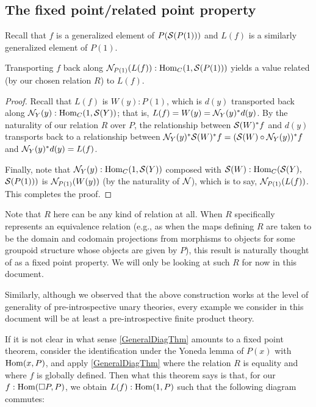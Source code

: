 \subsection{The fixed point/related point property}
Recall that $f$ is a generalized element of $P(\mathcal{S}(P(1)))$ and $L(f)$ is a similarly generalized element of $P(1)$.
\begin{theorem}\label{GeneralDiagThm}
Transporting $f$ back along $\mathcal{N}_{P(1)}(L(f)) : \operatorname{Hom}_C(1, \mathcal{S}(P(1)))$ yields a value related (by our chosen relation $R$) to $L(f)$.
\end{theorem}
\begin{proof}
Recall that $L(f)$ is $W(y) : P(1)$, which is $d(y)$ transported back along $\mathcal{N}_Y(y) : \operatorname{Hom}_C(1, \mathcal{S}(Y))$; that is, $L(f) = W(y) = \mathcal{N}_Y(y)^* d(y)$. By the naturality of our relation $R$ over $P$, the relationship between $\mathcal{S}(W)^*f$ and $d(y)$ transports back to a relationship between $\mathcal{N}_Y(y)^* \mathcal{S}(W)^*f = (\mathcal{S}(W) \circ \mathcal{N}_Y(y))^* f$ and $\mathcal{N}_Y(y)^* d(y) = L(f)$.

Finally, note that $\mathcal{N}_Y(y) : \operatorname{Hom}_C(1, \mathcal{S}(Y))$ composed with $\mathcal{S}(W) : \operatorname{Hom}_C(\mathcal{S}(Y),$ $ \mathcal{S}(P(1)))$ is $\mathcal{N}_{P(1)}(W(y))$ (by the naturality of $\mathcal{N}$), which is to say, $\mathcal{N}_{P(1)}(L(f))$. This completes the proof.
\end{proof}

Note that $R$ here can be any kind of relation at all. When $R$ specifically represents an equivalence relation (e.g., as when the maps defining $R$ are taken to be the domain and codomain projections from morphisms to objects for some groupoid structure whose objects are given by $P$), this result is naturally thought of as a fixed point property. We will only be looking at such $R$ for now in this document.

Similarly, although we observed that the above construction works at the level of generality of pre-introspective unary theories, every example we consider in this document will be at least a pre-introspective finite product theory.

If it is not clear in what sense \cref{GeneralDiagThm} amounts to a fixed point theorem, consider the identification under the Yoneda lemma of $P(x)$ with $\operatorname{Hom}(x, P)$, and apply \cref{GeneralDiagThm} where the relation $R$ is equality and where $f$ is globally defined. Then what this theorem says is that, for our $f : \operatorname{Hom}(\Box P, P)$, we obtain $L(f) : \operatorname{Hom}(1, P)$ such that the following diagram commutes:

